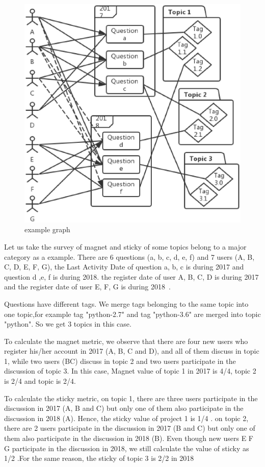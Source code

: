 \documentclass[conference]{IEEEtran}
\begin{document}
\begin{figure}[t]
 \centering
 \includegraphics[width=.9\hsize]{img/examplegraph1.eps}  
 \caption{example graph} 
 \label{fig:example1} 
\end{figure}
\smallskip
\smallskip

Let us take the survey of magnet and sticky of some topics belong to a major category as a example. There are 6 questions (a, b, c, d, e, f) and 7 users (A, B, C, D, E, F, G), the Last Activity Date of question a, b, c is during 2017 and question d ,e, f is during 2018. the register date of user A, B, C, D is during 2017 and the register date of user E, F, G is during 2018~\cite{yamashita2016magnet}.

Questions have different tags. We merge tags belonging to the same topic into one topic,for example tag "python-2.7" and tag "python-3.6" are merged into topic "python". So we get 3 topics in this case.

To calculate the magnet metric, we observe that there are four new users who register his/her account in 2017 (A, B, C and D), and all of them discuss in topic 1, while two users (BC) discuss in topic 2 and two users participate in the discussion of topic 3. In this case, Magnet value of topic 1 in 2017 is 4/4, topic 2 is 2/4 and topic is 2/4.

To calculate the sticky metric, on topic 1, there are three users participate in the discussion in 2017 (A, B and C) but only one of them also participate in the discussion in 2018 (A). Hence, the sticky value of project 1 is 1/4 . on topic 2, there are 2 users participate in the discussion in 2017 (B and C) but only one of them also participate in the discussion in 2018 (B). Even though new users E F G participate in the discussion in 2018, we still calculate the value of sticky as 1/2 .For the same reason, the sticky of topic 3 is 2/2 in {2018}
\end{document}
